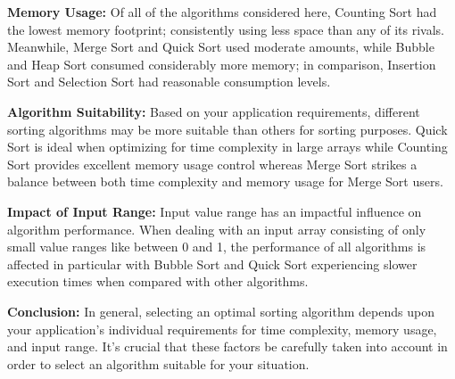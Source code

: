 \documentclass{article}
\begin{document}
\textbf{Memory Usage:} Of all of the algorithms considered here, Counting Sort had the lowest memory footprint; consistently using less space than any of its rivals. Meanwhile, Merge Sort and Quick Sort used moderate amounts, while Bubble and Heap Sort consumed considerably more memory; in comparison, Insertion Sort and Selection Sort had reasonable consumption levels.

\textbf{Algorithm Suitability:} Based on your application requirements, different sorting algorithms may be more suitable than others for sorting purposes. Quick Sort is ideal when optimizing for time complexity in large arrays while Counting Sort provides excellent memory usage control whereas Merge Sort strikes a balance between both time complexity and memory usage for Merge Sort users.

\textbf{Impact of Input Range:} Input value range has an impactful influence on algorithm performance. When dealing with an input array consisting of only small value ranges like between 0 and 1, the performance of all algorithms is affected in particular with Bubble Sort and Quick Sort experiencing slower execution times when compared with other algorithms.

\textbf{Conclusion:} In general, selecting an optimal sorting algorithm depends upon your application's individual requirements for time complexity, memory usage, and input range. It's crucial that these factors be carefully taken into account in order to select an algorithm suitable for your situation.
\end{document}
